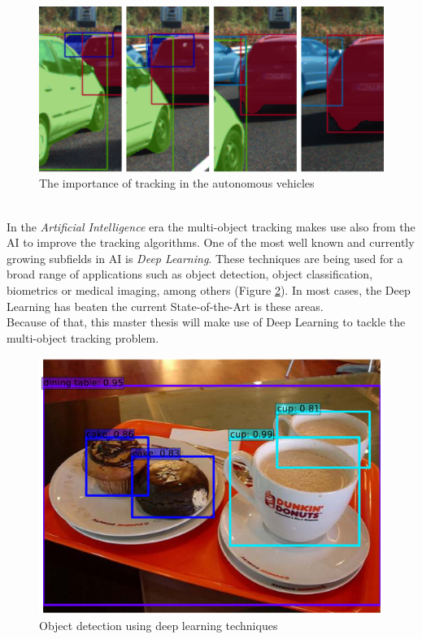 \begin{figure}[h!]
\begin{center}
\includegraphics[scale=0.4]{figures/adas_tracking.png}
\caption{The importance of tracking in the autonomous vehicles \cite{voigtlaender2019mots}}
\label{fig:adas_tracking}
\end{center}
\end{figure}\\
In the \textit{Artificial Intelligence} era the multi-object tracking makes use also from the AI to improve the tracking algorithms. One of the most well known and currently growing subfields in AI is \textit{Deep Learning}. These techniques are being used for a broad range of applications such as object detection, object classification, biometrics or medical imaging, among others (Figure \ref{fig:ssd_detection}). In most cases, the Deep Learning has beaten the current State-of-the-Art is these areas.\\
Because of that, this master thesis will make use of Deep Learning to tackle the multi-object tracking problem.
\begin{figure}[h!]
\begin{center}
\includegraphics[scale=0.35]{figures/ssd_detection.png}
\caption{Object detection using deep learning techniques \cite{liu2016ssd}}
\label{fig:ssd_detection}
\end{center}
\end{figure}

